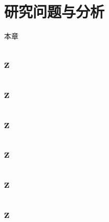 \chapter{研究问题与分析}\label{problem}
本章
\section{z}
\section{z}
\section{z}
\section{z}
\section{z}
\section{z}
 